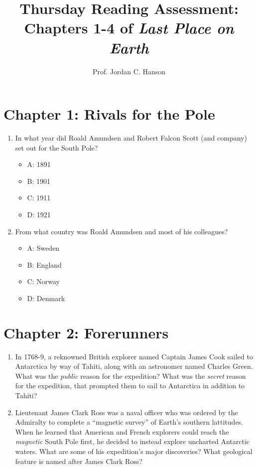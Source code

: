 \documentclass{article}
\begin{document}
\title{Thursday Reading Assessment: Chapters 1-4 of \textit{Last Place on Earth}}
\author{Prof. Jordan C. Hanson}

\maketitle

\section{Chapter 1: Rivals for the Pole}

\begin{enumerate}
\item In what year did Roald Amundsen and Robert Falcon Scott (and company) set out for the South Pole?
\begin{itemize}
\item A: 1891
\item B: 1901
\item C: 1911
\item D: 1921
\end{itemize}
\item From what country was Roald Amundsen and most of his colleagues?
\begin{itemize}
\item A: Sweden
\item B: England
\item C: Norway
\item D: Denmark
\end{itemize}
\end{enumerate}

\section{Chapter 2: Forerunners}

\begin{enumerate}
\item In 1768-9, a reknowned British explorer named Captain James Cook sailed to Antarctica by way of Tahiti, along with an astronomer named Charles Green.  What was the \textit{public} reason for the expedition?  What was the \textit{secret} reason for the expedition, that prompted them to sail to Antarctica in addition to Tahiti? \\ \vspace{3cm}
\item Lieutenant James Clark Ross was a naval officer who was ordered by the Admiralty to complete a ``magnetic survey'' of Earth's southern lattitudes.  When he learned that American and French explorers could reach the \textit{magnetic} South Pole first, he decided to instead explore uncharted Antarctic waters.  What are some of his expedition's major discoveries?  What geological feature is named after James Clark Ross?  \\ \vspace{3cm}
\end{enumerate}
\end{document}
